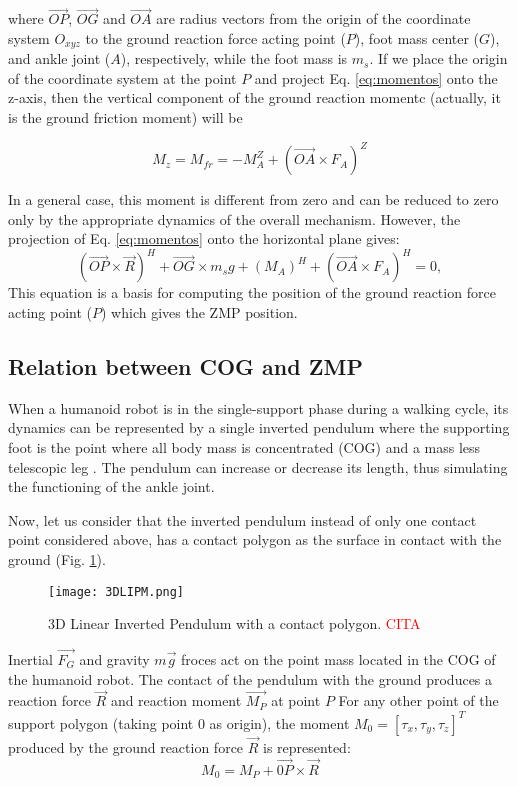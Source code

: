 where $\overrightarrow{OP}$, $\overrightarrow{OG}$ and $\overrightarrow{OA}$ are radius vectors from the origin of the coordinate system $O_{xyz}$ to the ground reaction force acting point ($P$), foot mass center ($G$), and ankle joint ($A$), respectively, while the foot mass is $m_s$. If we place the origin of the coordinate system at the point $P$ and project Eq. \ref{eq:momentos} onto the z-axis, then the vertical component of the ground reaction momentc (actually, it is the ground friction moment) will be

\begin{equation}
M_z = M_{fr} = -M_A^Z + (\overrightarrow{OA} \times F_A)^Z
\end{equation}

In a general case, this moment is different from zero and can be reduced to zero only by the appropriate dynamics of the overall mechanism. However, the projection of Eq. \ref{eq:momentos} onto the horizontal plane gives:
\begin{equation}
(\overrightarrow{OP} \times \overrightarrow{R})^H + \overrightarrow{OG} \times m_sg + (M_A)^H + (\overrightarrow{OA} \times F_A)^H = 0,
\label{eq:momentos}
\end{equation}
This equation is a basis for computing the position of the ground reaction force acting point ($P$) which gives the ZMP position.


\subsection{Relation between COG and ZMP}
When a humanoid robot is in the single-support phase during a walking cycle, its dynamics can be represented by a single inverted pendulum where the supporting foot is the point where all body mass is concentrated (COG) and a mass less telescopic leg \cite{Kaj2001}. The pendulum can increase or decrease its length, thus simulating the functioning of the ankle joint.

Now, let us consider that the inverted pendulum instead of only one contact point considered above, has a contact polygon as the surface in contact with the ground (Fig. \ref{fig:3DLIPM}).

\begin{figure}[!hbt]
\centering
\texttt{[image: 3DLIPM.png]}
\caption{3D Linear Inverted Pendulum with a contact polygon. \textcolor{red}{CITA}}
\label{fig:3DLIPM}
\end{figure}

Inertial $\overrightarrow{F_G}$ and gravity $m\overrightarrow{g}$ froces act on the point mass located in the COG of the humanoid robot. The contact of the pendulum with the ground produces a reaction force $\overrightarrow{R}$ and reaction moment $\overrightarrow{M_P}$ at point $P$ For any other point of the support polygon (taking point 0 as origin), the moment $M_0=[\tau_x, \tau_y, \tau_z]^T$ produced by the ground reaction force $\overrightarrow{R}$ is represented: 
\begin{equation}
M_0 = M_P + \overrightarrow{0P} \times \overrightarrow{R}
\label{eq:M0}
\end{equation}


